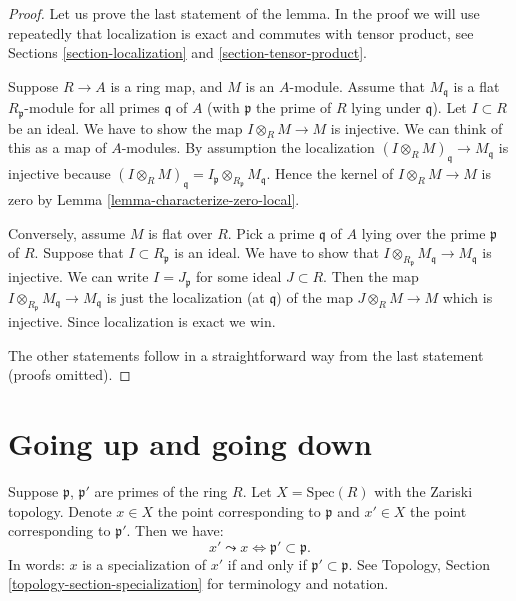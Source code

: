 \begin{proof}
Let us prove the last statement of the lemma.
In the proof we will use repeatedly that localization is exact
and commutes with tensor product, see Sections \ref{section-localization}
and \ref{section-tensor-product}.

\medskip\noindent
Suppose $R \to A$ is a ring map, and $M$ is an $A$-module.
Assume that $M_{\mathfrak q}$ is a flat $R_{\mathfrak p}$-module
for all primes $\mathfrak q$ of $A$ (with $\mathfrak p$ the prime of
$R$ lying under $\mathfrak q$). Let $I \subset R$ be an ideal.
We have to show the map $I \otimes_R M \to M$ is injective.
We can think of this as a map of $A$-modules.
By assumption the localization
$(I \otimes_R M)_{\mathfrak q} \to M_{\mathfrak q}$ is injective
because
$(I \otimes_R M)_{\mathfrak q} =
I_{\mathfrak p} \otimes_{R_{\mathfrak p}} M_{\mathfrak q}$.
Hence the kernel of $I \otimes_R M \to M$ is zero by
Lemma \ref{lemma-characterize-zero-local}.

\medskip\noindent
Conversely, assume $M$ is flat over $R$. Pick a prime $\mathfrak q$
of $A$ lying over the prime $\mathfrak p$ of $R$. Suppose that
$I \subset R_{\mathfrak p}$ is an ideal. We have to show that
$I \otimes_{R_{\mathfrak p}} M_{\mathfrak q} \to M_{\mathfrak q}$
is injective. We can write $I = J_{\mathfrak p}$ for some
ideal $J \subset R$. Then the map
$I \otimes_{R_{\mathfrak p}} M_{\mathfrak q} \to M_{\mathfrak q}$
is just the localization (at $\mathfrak q$) of the map
$J \otimes_R M \to M$ which is injective. Since localization is exact
we win.

\medskip\noindent
The other statements follow in a straightforward way from the last statement
(proofs omitted).
\end{proof}















\section{Going up and going down}
\label{section-going-up}

\noindent
Suppose $\mathfrak p$, $\mathfrak p'$ are primes
of the ring $R$. Let $X = \text{Spec}(R)$ with the Zariski
topology. Denote $x \in X$ the point corresponding
to $\mathfrak p$ and $x' \in X$ the point corresponding
to $\mathfrak p'$. Then we have:
$$
x' \leadsto x \Leftrightarrow \mathfrak p' \subset \mathfrak p.
$$
In words: $x$ is a specialization of $x'$ if and
only if $\mathfrak p' \subset \mathfrak p$.
See Topology, Section \ref{topology-section-specialization}
for terminology and notation.

